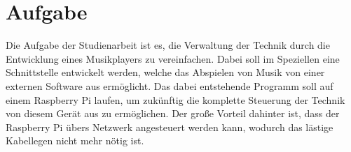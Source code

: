 \section{Aufgabe}
Die Aufgabe der Studienarbeit ist es, die Verwaltung der Technik durch die
Entwicklung eines Musikplayers zu vereinfachen. Dabei soll im Speziellen eine
Schnittstelle entwickelt werden, welche das Abspielen von Musik von einer
externen Software aus ermöglicht. Das dabei entstehende Programm soll auf einem
Raspberry Pi laufen, um zukünftig die komplette Steuerung der Technik von
diesem Gerät aus zu ermöglichen. Der große Vorteil dahinter ist, dass der
Raspberry Pi übers Netzwerk angesteuert werden kann, wodurch das lästige
Kabellegen nicht mehr nötig ist.

